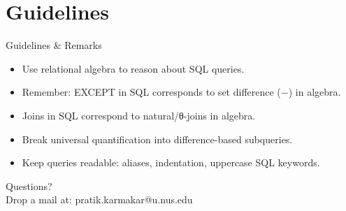 \documentclass{beamer}
\begin{document}
\section{Guidelines}
\begin{frame}{Guidelines \& Remarks}
\small
\begin{itemize}\itemsep4pt
  \item Use relational algebra to reason about SQL queries.
  \item Remember: EXCEPT in SQL corresponds to set difference (−) in algebra.
  \item Joins in SQL correspond to natural/θ-joins in algebra.
  \item Break universal quantification into difference-based subqueries.
  \item Keep queries readable: aliases, indentation, uppercase SQL keywords.
\end{itemize}
\end{frame}

\begin{frame}
\begin{center}
Questions?\\
Drop a mail at: pratik.karmakar@u.nus.edu
\end{center}
\end{frame}
\end{document}
